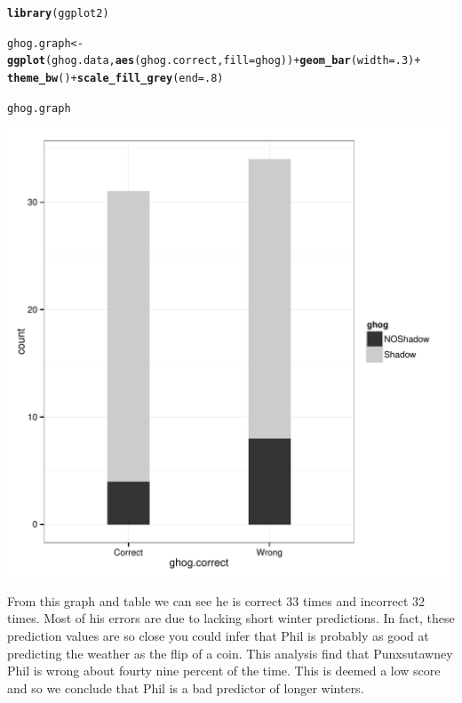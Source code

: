 \documentclass[12pt]{article}\usepackage[]{graphicx}\usepackage[]{color}
\makeatletter
\def\maxwidth{ %
  \ifdim\Gin@nat@width>\linewidth
    \linewidth
  \else
    \Gin@nat@width
  \fi
}
\newcommand{\hlnum}[1]{\textcolor[rgb]{0.686,0.059,0.569}{#1}}%
\newcommand{\hlopt}[1]{\textcolor[rgb]{0,0,0}{#1}}%
\newcommand{\hlstd}[1]{\textcolor[rgb]{0.345,0.345,0.345}{#1}}%
\newcommand{\hlkwb}[1]{\textcolor[rgb]{0.69,0.353,0.396}{#1}}%
\newcommand{\hlkwc}[1]{\textcolor[rgb]{0.333,0.667,0.333}{#1}}%
\newcommand{\hlkwd}[1]{\textcolor[rgb]{0.737,0.353,0.396}{\textbf{#1}}}%
\newenvironment{kframe}{%
 \def\at@end@of@kframe{}%
 \ifinner\ifhmode%
  \def\at@end@of@kframe{\end{minipage}}%
  \begin{minipage}{\columnwidth}%
 \fi\fi%
 \def\FrameCommand##1{\hskip\@totalleftmargin \hskip-\fboxsep
 \colorbox{shadecolor}{##1}\hskip-\fboxsep
     \hskip-\linewidth \hskip-\@totalleftmargin \hskip\columnwidth}%
 \MakeFramed {\advance\hsize-\width
   \@totalleftmargin\z@ \linewidth\hsize
   \@setminipage}}%
 {\par\unskip\endMakeFramed%
 \at@end@of@kframe}
\newenvironment{knitrout}{}{} %
\makeatother
\begin{document}
\begin{knitrout}
\color{fgcolor}\begin{kframe}
\begin{alltt}
 \hlkwd{library}\hlstd{(ggplot2)}

\hlstd{ghog.graph} \hlkwb{<-} \hlkwd{ggplot}\hlstd{(ghog.data,} \hlkwd{aes}\hlstd{(ghog.correct,}\hlkwc{fill}\hlstd{=ghog))} \hlopt{+} \hlkwd{geom_bar}\hlstd{(}\hlkwc{width}\hlstd{=}\hlnum{.3}\hlstd{)} \hlopt{+}
   \hlkwd{theme_bw}\hlstd{()} \hlopt{+} \hlkwd{scale_fill_grey}\hlstd{(}\hlkwc{end}\hlstd{=}\hlnum{.8}\hlstd{)}

\hlstd{ghog.graph}
\end{alltt}
\end{kframe}
\includegraphics[width=\maxwidth]{figure/bargraph} 

\end{knitrout}

From this graph and table we can see he is correct 33 times and incorrect 32 times. Most of his errors are due to lacking short winter predictions. In fact, these prediction values are so close you could infer that Phil is probably as good at predicting the weather as the flip of a coin. This analysis find that  Punxsutawney Phil is wrong about fourty nine percent of the time. This is deemed a low score and so we conclude that Phil is a bad predictor of longer winters.
\end{document}
